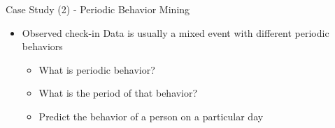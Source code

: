 \documentclass[
 size=14pt,
 paper=smartboard,  %
 mode=present, 		%
 display=slides, 	%
 style=tuliplab,  	%
 pauseslide,
 fleqn,leqno]{powerdot}{}
\begin{document}
\begin{slide}[toc=,bm=]{Case Study (2) - Periodic Behavior Mining}

\begin{itemize}
\item
Observed check-in Data is usually a mixed event with different periodic behaviors

\begin{itemize}
\item
What is periodic behavior?

\item
What is the period of that behavior?

\item
Predict the behavior of a person on a particular day
\end{itemize}
\end{itemize}



\end{slide}
\end{document}
